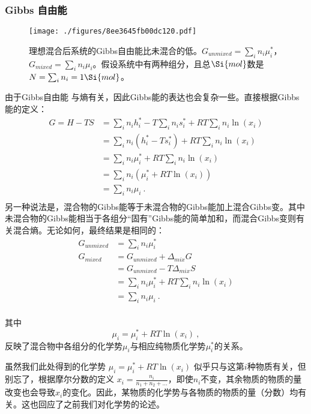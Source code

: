 \subsubsection{Gibbs 自由能}

\begin{figure}[ht]
\centering
\texttt{[image: ./figures/8ee3645fb00dc120.pdf]}
\caption{理想混合后系统的Gibbs自由能比未混合的低。$G_{unmixed}=\sum_i n_i \mu_i^*$，$G_{mixed}= \sum_i n_i \mu_i$。假设系统中有两种组分，且总$\Si{mol}$数是$N=\sum_i n_i =1 \Si{mol}$。} \label{fig_IMCPTV_2}
\end{figure}
由于Gibbs自由能 与熵有关，因此Gibbs能的表达也会复杂一些。直接根据Gibbs能的定义：
$$
\begin{aligned}
G = H-TS &= \sum_i n_i h_i^* - T \sum_i n_i s_i^* + RT \sum_i n_i \ln (x_i)\\ 
&= \sum_i n_i (h_i^* - T s_i^*) + RT \sum_i n_i \ln (x_i)\\
& = \sum_i n_i \mu_i^* + RT \sum_i n_i \ln (x_i)\\
&=\sum_i n_i (\mu_i^* + RT \ln (x_i))\\
&= \sum_i n_i \mu_i~.\\
\end{aligned}
$$
另一种说法是，混合物的Gibbs能等于未混合物的Gibbs能加上混合Gibbs变。其中未混合物的Gibbs能相当于各组分“固有”Gibbs能的简单加和，而混合Gibbs变则有关混合熵。无论如何，最终结果是相同的：
$$
\begin{aligned}
G_{unmixed}&=\sum_i n_i \mu_i^*\\
G_{mixed} &= G_{unmixed} + \Delta_{mix} G\\ 
&=G_{unmixed} -  T \Delta_{mix} S\\
& = \sum_i n_i \mu_i^* + RT \sum_i n_i \ln (x_i)\\
&= \sum_i n_i \mu_i~.\\
\end{aligned}
$$

其中
$$
\mu_i = \mu_i^* + RT \ln (x_i)~,
$$
反映了混合物中各组分的化学势$\mu_i$与相应纯物质化学势$\mu_i^*$的关系。%

虽然我们此处得到的化学势 $\mu_i = \mu_i^* + RT \ln (x_i)$ 似乎只与这第$i$种物质有关，但别忘了，根据摩尔分数的定义 $x_i = \frac{n_i}{n_1+n_2+...}$，即使$n_i$不变，其余物质的物质的量改变也会导致$x_i$的变化。因此，某物质的化学势与各物质的物质的量（分数）均有关。这也回应了之前我们对化学势的论述。
